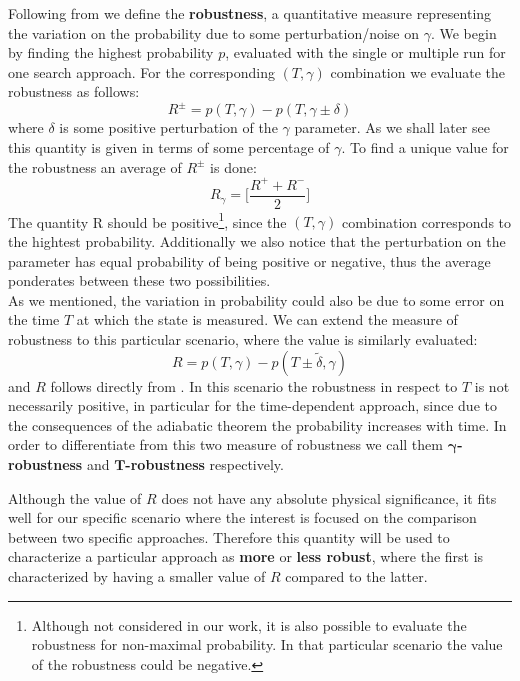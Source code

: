         Following from \cite{SH.HungS.Hietala2019} we define the \textbf{robustness}, a quantitative measure representing the variation on the probability due to some perturbation/noise on $\gamma$.
        We begin by finding the highest probability $p$, evaluated with the single or multiple run for one search approach. For the corresponding $(T,\gamma)$ combination we evaluate the robustness as follows:
        \begin{equation}
            R ^\pm = p(T, \gamma) - p(T, \gamma \pm \delta)
        \end{equation}
        where $\delta$ is some positive perturbation of the $\gamma$ parameter. As we shall later see this quantity is given in terms of some percentage of $\gamma$. To find a unique value for the robustness an average of $R^\pm$ is done:
        \begin{equation}
            R_\gamma = \bigg[\frac{R^++ R^-}{2}\bigg]
            \label{eq:robustness}
        \end{equation}
        The quantity R should be positive\footnote{ Although not considered in our work, it is also possible to evaluate the robustness for non-maximal probability. In that particular scenario the value of the robustness could be negative.}, since the $(T,\gamma)$ combination corresponds to the hightest probability. Additionally we also notice that the perturbation on the parameter has equal probability of being positive or negative, thus the average ponderates between these two possibilities. \\

        \noindent
        As we mentioned, the variation in probability could also be due to some error on the time $T$ at which the state is measured. We can extend the measure of robustness to this particular scenario, where the value is similarly evaluated:
        \begin{equation}
            R = p(T, \gamma) - p(T \pm \tilde{\delta}, \gamma )
        \end{equation}
        and $R$ follows directly from . In this scenario the robustness in respect to $T$ is not necessarily positive, in particular for the time-dependent approach, since due to the consequences of the adiabatic theorem the probability increases with time.
        In order to differentiate from this two measure of robustness we call them \textbf{$\bm{\gamma}$-robustness} and \textbf{$\bm{T}$-robustness} respectively.


        Although the value of $R$ does not have any absolute physical significance, it fits well for our specific scenario where the interest is focused on the comparison between two specific approaches. Therefore this quantity will be used to characterize a particular approach as \textbf{more} or \textbf{less robust}, where the first is characterized by having a smaller value of $R$ compared to the latter.

